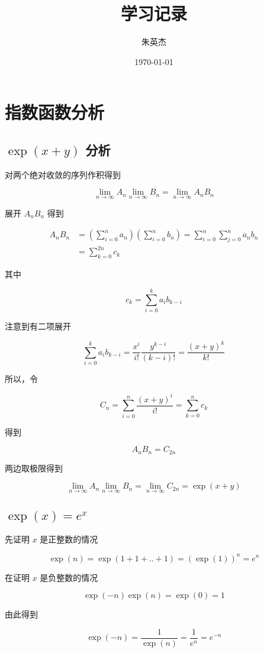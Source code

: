 \documentclass[12pt,a4paper]{ctexart}
\title{学习记录}
\author{朱英杰}
\date{\today}
\begin{document}
\maketitle
\tableofcontents

\section{指数函数分析}

\subsection{$\exp(x+y)$ 分析}

对两个绝对收敛的序列作积得到

\[
\lim_{n \to \infty}A_n\lim_{n \to \infty}B_n = \lim_{n \to \infty} A_nB_n
\]

展开 $A_nB_n$ 得到

\begin{align*}
A_nB_n &=(\sum_{i=0}^{n}a_n)(\sum_{i=0}^{n}b_n) = \sum_{i=0}^{n}\sum_{j=0}^{n}a_nb_n \\
&= \sum_{k=0}^{2n}c_k
\end{align*}

其中 

\[
c_k = \sum_{i=0}^{k}a_ib_{k-i}
\]

注意到有二项展开

\[
\sum_{i=0}^{k}a_ib_{k-i} = \frac{x^i}{i!}\frac{y^{k-i}}{(k-i)!} = \frac{(x+y)^k}{k!}
\]

所以，令

\[
C_n = \sum_{i=0}^{n}\frac{(x+y)^i}{i!} = \sum_{k=0}^{n}c_{k}
\]

得到

\[
A_nB_n = C_{2n}
\]

两边取极限得到

\[
\lim_{n \to \infty}A_n \lim_{n \to \infty}B_n = \lim_{n \to \infty}C_{2n} = \exp(x+y)
\]

\subsection{$\exp(x) = e^x$}

先证明 $x$ 是正整数的情况

\[
\exp(n) = \exp(1+1+..+1) = (\exp(1))^n = e^n
\]

在证明 $x$ 是负整数的情况

\[
\exp(-n)\exp(n) = \exp(0) = 1
\]

由此得到

\[
\exp(-n) = \frac{1}{\exp(n)} = \frac{1}{e^n} = e^{-n}
\]
\end{document}

